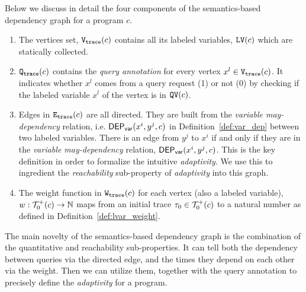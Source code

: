 Below we discuss in detail the four components of the semantics-based dependency graph for a program $c$.
\begin{enumerate}
 \item The vertices set, $\mathtt{{V_{trace}}}({c})$ contains all its labeled variables, $\mathtt{LV}(c)$ which are statically collected.
 \item $\mathtt{{Q_{trace}}}(c)$ contains the \emph{query annotation} for 
 every vertex $x^l \in \mathtt{{V_{trace}}}(c)$. It indicates whether $x^l$ comes from a query request (1) or not (0) by checking if the labeled variable $x^l$ of the vertex is in $\mathtt{QV}(c)$.
 \item Edges in $\mathtt{{E_{trace}}}(c)$ are all directed.
 They are built from the \emph{variable may-dependency} relation, i.e. $\mathsf{DEP_{var}}(x^i, y^j, c)$ in Definition~\ref{def:var_dep} between two labeled variables.
 There is an edge from $y^j$ to $x^i$ if and only if they are in the \emph{variable may-dependency} relation, $\mathsf{DEP_{var}}(x^i, y^j, c)$. 
 This is the key definition in order to formalize the intuitive \emph{adaptivity}. We use this to ingredient the \emph{reachability} sub-property of \emph{adaptivity} into this graph.
 \item 
The weight function in $\mathtt{{W_{trace}}}(c)$ for each vertex (also a labeled variable), $w : \mathcal{T}^{+}_0(c) \to \mathbb{N}$
maps from an initial trace $\mathtt{\tau}_0 \in \mathcal{T}^{+}_0(c)$ to a natural number as defined in Definition~\ref{def:lvar_weight}.

\end{enumerate}
The main novelty of the semantics-based dependency graph is the combination of the quantitative and reachability sub-properties. 
It can tell both the dependency between queries via the directed edge, and the times they depend on each other via the weight.
Then we can utilize them, together with the query annotation to precisely define the \emph{adaptivity} for a program.


